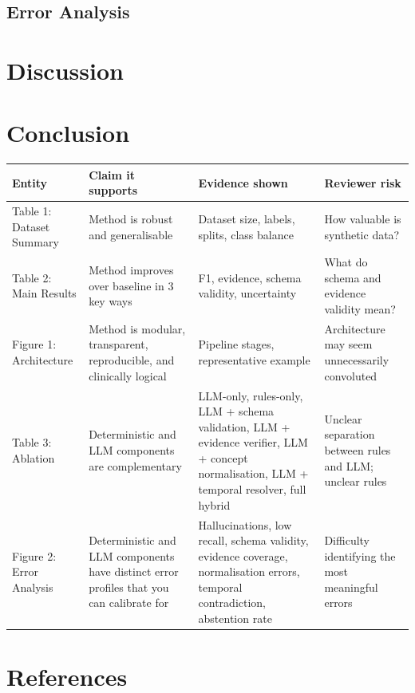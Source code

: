 \documentclass[conference]{IEEEtran}
\begin{document}
\subsection{Error Analysis}

\section{Discussion}

\section{Conclusion}

\begin{tabularx}{\linewidth}{|Y|Y|Y|Y|}
\hline
\textbf{Entity} &
\textbf{Claim it supports} &
\textbf{Evidence shown} &
\textbf{Reviewer risk} \\
\hline

Table 1: Dataset Summary &
Method is robust and generalisable &
Dataset size, labels, splits, class balance &
How valuable is synthetic data? \\
\hline

Table 2: Main Results &
Method improves over baseline in 3 key ways &
F1, evidence, schema validity, uncertainty &
What do schema and evidence validity mean? \\
\hline

Figure 1: Architecture &
Method is modular, transparent, reproducible, and clinically logical &
Pipeline stages, representative example &
Architecture may seem unnecessarily convoluted \\
\hline

Table 3: Ablation &
Deterministic and LLM components are complementary &
LLM-only, rules-only, LLM + schema validation, LLM + evidence verifier,
LLM + concept normalisation, LLM + temporal resolver, full hybrid &
Unclear separation between rules and LLM; unclear rules \\
\hline

Figure 2: Error Analysis &
Deterministic and LLM components have distinct error profiles that you can calibrate for &
Hallucinations, low recall, schema validity, evidence coverage,
normalisation errors, temporal contradiction, abstention rate &
Difficulty identifying the most meaningful errors \\
\hline
\end{tabularx}

\section*{References}
\end{document}
